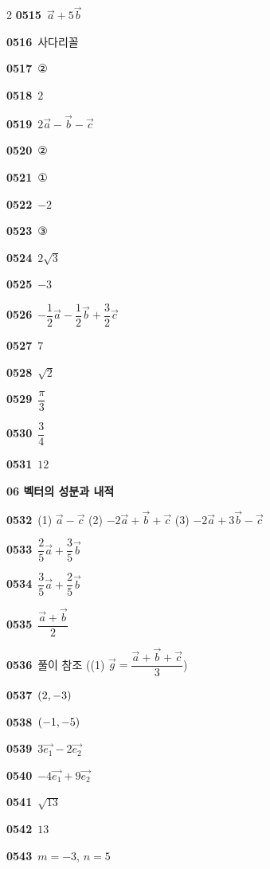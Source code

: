 \documentclass[10pt,a4paper]{article}
\begin{document}
\begin{multicols}{2}
\noindent\textbf{0515}\ $\vec{a}+5\vec{b}$\par
\noindent\textbf{0516}\ 사다리꼴\par
\noindent\textbf{0517}\ ②\par
\noindent\textbf{0518}\ $2$\par
\noindent\textbf{0519}\ $2\vec{a}-\vec{b}-\vec{c}$\par
\noindent\textbf{0520}\ ②\par
\noindent\textbf{0521}\ ①\par
\noindent\textbf{0522}\ $-2$\par
\noindent\textbf{0523}\ ③\par
\noindent\textbf{0524}\ $2\sqrt{3}$\par
\noindent\textbf{0525}\ $-3$\par
\noindent\textbf{0526}\ $-\dfrac{1}{2}\vec{a}-\dfrac{1}{2}\vec{b}+\dfrac{3}{2}\vec{c}$\par
\noindent\textbf{0527}\ $7$\par
\noindent\textbf{0528}\ $\sqrt{2}$\par
\noindent\textbf{0529}\ $\dfrac{\pi}{3}$\par
\noindent\textbf{0530}\ $\dfrac{3}{4}$\par
\noindent\textbf{0531}\ $12$\par
\noindent\textbf{06 벡터의 성분과 내적}\par\smallskip
\noindent\textbf{0532}\ (1) $\vec{a}-\vec{c}$ (2) $-2\vec{a}+\vec{b}+\vec{c}$ (3) $-2\vec{a}+3\vec{b}-\vec{c}$\par
\noindent\textbf{0533}\ $\dfrac{2}{5}\vec{a}+\dfrac{3}{5}\vec{b}$\par
\noindent\textbf{0534}\ $\dfrac{3}{5}\vec{a}+\dfrac{2}{5}\vec{b}$\par
\noindent\textbf{0535}\ $\dfrac{\vec{a}+\vec{b}}{2}$\par
\noindent\textbf{0536}\ 풀이 참조 ((1) $\vec{g}=\dfrac{\vec{a}+\vec{b}+\vec{c}}{3}$)\par
\noindent\textbf{0537}\ $(2{,}\mkern3mu\mathopen{}-3)$\par
\noindent\textbf{0538}\ $(-1{,}\mkern3mu\mathopen{}-5)$\par
\noindent\textbf{0539}\ $3\vec{e_1}-2\vec{e_2}$\par
\noindent\textbf{0540}\ $-4\vec{e_1}+9\vec{e_2}$\par
\noindent\textbf{0541}\ $\sqrt{13}$\par
\noindent\textbf{0542}\ $13$\par
\noindent\textbf{0543}\ $m=-3$, $n=5$\par

\end{multicols}
\end{document}
